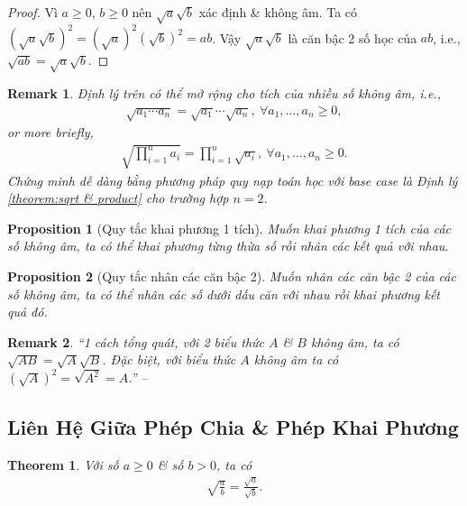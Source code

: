 \documentclass{article}
\numberwithin{equation}{section}
\newtheorem{proposition}{Proposition}[section]
\newtheorem{remark}{Remark}[section]
\newtheorem{theorem}{Theorem}[section]
\begin{document}
\begin{proof}
	Vì $a\ge 0$, $b\ge 0$ nên $\sqrt{a}\sqrt{b}$ xác định \& không âm. Ta có $(\sqrt{a}\sqrt{b})^2 = (\sqrt{a})^2(\sqrt{b})^2 = ab$. Vậy $\sqrt{a}\sqrt{b}$ là căn bậc 2 số học của $ab$, i.e., $\sqrt{ab} = \sqrt{a}\sqrt{b}$.
\end{proof}

\begin{remark}
	Định lý trên có thể mở rộng cho tích của nhiều số không âm, i.e.,
	\begin{align*}
		\sqrt{a_1\cdots a_n} = \sqrt{a_1}\cdots\sqrt{a_n},\ \forall a_1,\ldots,a_n\ge 0,
	\end{align*}
	or more briefly,
	\begin{align*}
		\sqrt{\prod_{i=1}^n a_i} = \prod_{i=1}^n \sqrt{a_i},\ \forall a_1,\ldots,a_n\ge 0.
	\end{align*}
	Chứng minh dễ dàng bằng phương pháp quy nạp toán học với base case là Định lý \ref{theorem:sqrt & product} cho trường hợp $n = 2$.
\end{remark}

\begin{proposition}[Quy tắc khai phương 1 tích]
	Muốn khai phương 1 tích của các số không âm, ta có thể khai phương từng thừa số rồi nhân các kết quả với nhau.
\end{proposition}

\begin{proposition}[Quy tắc nhân các căn bậc 2]
	Muốn nhân các căn bậc 2 của các số không âm, ta có thể nhân các số dưới dấu căn với nhau rồi khai phương kết quả đó.
\end{proposition}

\begin{remark}
	``1 cách tổng quát, với 2 biểu thức $A$ \& $B$ không âm, ta có $\sqrt{AB} = \sqrt{A}\sqrt{B}$. Đặc biệt, với biểu thức $A$ không âm ta có $(\sqrt{A})^2 = \sqrt{A^2} = A$.'' -- \cite[p. 14]{SGK_Toan_9_tap_1}
\end{remark}

\subsection{Liên Hệ Giữa Phép Chia \& Phép Khai Phương}
\begin{theorem}
	Với số $a\ge 0$ \& số $b > 0$, ta có
	\begin{align*}
		\sqrt{\frac{a}{b}} = \frac{\sqrt{a}}{\sqrt{b}}.
	\end{align*}
\end{theorem}
\end{document}
